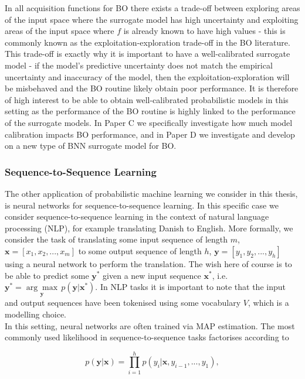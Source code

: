 \noindent In all acquisition functions for BO there exists a trade-off between exploring areas of the input space where the surrogate model has high uncertainty and exploiting areas of the input space where $f$ is already known to have high values - this is commonly known as the exploitation-exploration trade-off in the BO literature. This trade-off is exactly why it is important to have a well-calibrated surrogate model - if the model's predictive uncertainty does not match the empirical uncertainty and inaccuracy of the model, then the exploitation-exploration will be misbehaved and the BO routine likely obtain poor performance. It is therefore of high interest to be able to obtain well-calibrated probabilistic models in this setting as the performance of the BO routine is highly linked to the performance of the surrogate models. In Paper C we specifically investigate how much model calibration impacts BO performance, and in Paper D we investigate and develop on a new type of BNN surrogate model for BO.

\subsubsection*{Sequence-to-Sequence Learning}
\label{sec:seqtoseq}
The other application of probabilistic machine learning we consider in this thesis, is neural networks for sequence-to-sequence learning. In this specific case we consider sequence-to-sequence learning in the context of natural language processing (NLP), for example translating Danish to English. More formally, we consider the task of translating some input sequence of length $m$, $\mathbf{x}=[x_1, x_2, ..., x_m]$ to some output sequence of length $h$, $\mathbf{y}=[y_1, y_2, ..., y_h]$ using a neural network to perform the translation. The wish here of course is to be able to predict some $\mathbf{y}^*$ given a new input sequence $\mathbf{x}^*$, i.e. $\mathbf{y}^*=\underset{\mathbf{y}}{\arg\max}\,p(\mathbf{y}|\mathbf{x}^*)$. In NLP tasks it is important to note that the input and output sequences have been tokenised using some vocabulary $V$, which is a modelling choice. \\

\noindent In this setting, neural networks are often trained via MAP estimation. The most commonly used likelihood in sequence-to-sequence tasks factorises according to

\begin{equation}
    p(\mathbf{y}|\mathbf{x}) = \prod^h_{i=1}p(y_i|\mathbf{x}, y_{i-1},...,y_{1}),
\end{equation}

